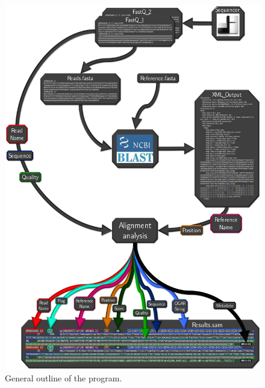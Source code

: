 \begin{figure}
\includegraphics[scale=0.75]{img/generalOutline}
\caption{General outline of the program.}\label{fig:generalOutline}
\end{figure}

